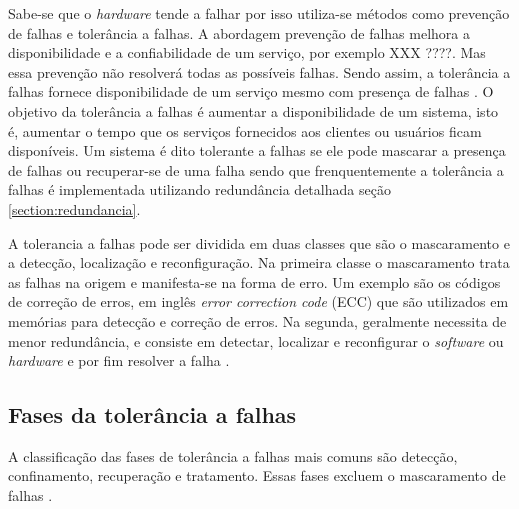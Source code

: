 Sabe-se que o \textit{hardware} tende a falhar por isso utiliza-se métodos como prevenção de falhas e tolerância a falhas. A abordagem 
prevenção de falhas melhora a disponibilidade e a confiabilidade de um serviço, por exemplo XXX ????. Mas essa prevenção não resolverá todas as 
possíveis falhas. Sendo assim, a tolerância a falhas fornece disponibilidade de um serviço mesmo com presença de falhas \cite{pankaj1994}.
O objetivo da tolerância a falhas é aumentar a disponibilidade de um sistema, isto é, aumentar o tempo que os serviços fornecidos aos 
clientes ou usuários ficam disponíveis. Um sistema é dito tolerante a falhas se ele pode mascarar a presença de falhas ou recuperar-se 
de uma falha sendo que frenquentemente a tolerância a falhas é implementada utilizando redundância detalhada seção \ref{section:redundancia}.

A tolerancia a falhas pode ser dividida em duas classes que são o mascaramento e a detecção, localização e reconfiguração.
Na primeira classe o mascaramento trata as falhas na origem e manifesta-se na forma de erro. Um exemplo são os códigos de correção de 
erros, em inglês \textit{error correction code} (ECC) que são utilizados em memórias para detecção e correção de erros.
Na segunda, geralmente necessita de menor redundância, e consiste em detectar, localizar e reconfigurar o \textit{software} ou
\textit{hardware} e por fim resolver a falha \cite{weber2002}.

\subsection{Fases da tolerância a falhas}

A classificação das fases de tolerância a falhas mais comuns são detecção, confinamento, recuperação e tratamento. Essas fases excluem
o mascaramento de falhas \cite{weber2002}.


